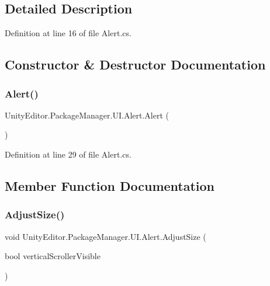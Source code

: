 \subsection{Detailed Description}


Definition at line 16 of file Alert.\+cs.



\subsection{Constructor \& Destructor Documentation}
\mbox{\label{class_unity_editor_1_1_package_manager_1_1_u_i_1_1_alert_a98a897e72d9a172a974610963a989589}} 
\subsubsection{\texorpdfstring{Alert()}{Alert()}}
{\footnotesize\ttfamily Unity\+Editor.\+Package\+Manager.\+U\+I.\+Alert.\+Alert (\begin{DoxyParamCaption}{ }\end{DoxyParamCaption})}



Definition at line 29 of file Alert.\+cs.



\subsection{Member Function Documentation}
\mbox{\label{class_unity_editor_1_1_package_manager_1_1_u_i_1_1_alert_adefee73ba0a86c091a7325b8abc033a1}} 
\subsubsection{\texorpdfstring{AdjustSize()}{AdjustSize()}}
{\footnotesize\ttfamily void Unity\+Editor.\+Package\+Manager.\+U\+I.\+Alert.\+Adjust\+Size (\begin{DoxyParamCaption}\item[{bool}]{vertical\+Scroller\+Visible }\end{DoxyParamCaption})}



